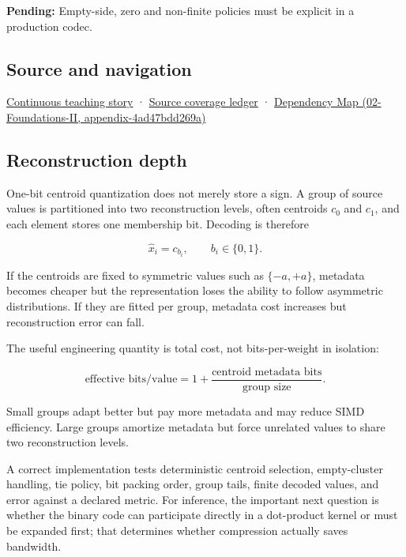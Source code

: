 \textbf{Pending:} Empty-side, zero and non-finite policies must be explicit in a production codec.

\subsection{Source and navigation}\label{appendix-4ccd7a775813-source-and-navigation}

\hyperref[01-foundations-i-ch001-choosing-what-information-to-keep]{Continuous teaching story} · \hyperref[appendix-fd090d982a15]{Source coverage ledger} · \href{../02-Foundations-II/main.pdf\#nameddest=appendix-4ad47bdd269a}{Dependency Map (02-Foundations-II, appendix-4ad47bdd269a)}

\subsection{Reconstruction depth}\label{appendix-4ccd7a775813-reconstruction-depth}

One-bit centroid quantization does not merely store a sign. A group of source values is partitioned into two reconstruction levels, often centroids \(c_0\) and \(c_1\), and each element stores one membership bit. Decoding is therefore

\[
\hat x_i = c_{b_i},
\qquad b_i\in\{0,1\}.
\]

If the centroids are fixed to symmetric values such as \(\{-a,+a\}\), metadata becomes cheaper but the representation loses the ability to follow asymmetric distributions. If they are fitted per group, metadata cost increases but reconstruction error can fall.

The useful engineering quantity is total cost, not bits-per-weight in isolation:

\[
\text{effective bits/value}
=
1 + \frac{\text{centroid metadata bits}}{\text{group size}}.
\]

Small groups adapt better but pay more metadata and may reduce SIMD efficiency. Large groups amortize metadata but force unrelated values to share two reconstruction levels.

A correct implementation tests deterministic centroid selection, empty-cluster handling, tie policy, bit packing order, group tails, finite decoded values, and error against a declared metric. For inference, the important next question is whether the binary code can participate directly in a dot-product kernel or must be expanded first; that determines whether compression actually saves bandwidth.
